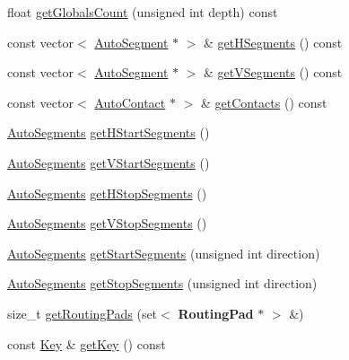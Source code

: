 \begin{DoxyCompactItemize}
\item 
float \hyperlink{classKatabatic_1_1GCell_a315f23abf15d879459eab98a6eeece12}{get\-Globals\-Count} (unsigned int depth) const 
\item 
const vector$<$ \hyperlink{classKatabatic_1_1AutoSegment}{Auto\-Segment} $\ast$ $>$ \& \hyperlink{classKatabatic_1_1GCell_ad885baf0428b0ffa73738e60b9fb6956}{get\-H\-Segments} () const 
\item 
const vector$<$ \hyperlink{classKatabatic_1_1AutoSegment}{Auto\-Segment} $\ast$ $>$ \& \hyperlink{classKatabatic_1_1GCell_a2c54706769cb88ca13d233726ded6f2f}{get\-V\-Segments} () const 
\item 
const vector$<$ \hyperlink{classKatabatic_1_1AutoContact}{Auto\-Contact} $\ast$ $>$ \& \hyperlink{classKatabatic_1_1GCell_ac2d662a9bbf5b80eb92776e4bce06ec5}{get\-Contacts} () const 
\item 
\hyperlink{namespaceKatabatic_a2221b0ddbc24f331809fc86f98e38041}{Auto\-Segments} \hyperlink{classKatabatic_1_1GCell_a79668a41675e9ba0ca59d4b91e3b70be}{get\-H\-Start\-Segments} ()
\item 
\hyperlink{namespaceKatabatic_a2221b0ddbc24f331809fc86f98e38041}{Auto\-Segments} \hyperlink{classKatabatic_1_1GCell_acbd17a4441905a4f5bc33a26bb338d0a}{get\-V\-Start\-Segments} ()
\item 
\hyperlink{namespaceKatabatic_a2221b0ddbc24f331809fc86f98e38041}{Auto\-Segments} \hyperlink{classKatabatic_1_1GCell_a77beccf65527a330f15bed2aba4f9dea}{get\-H\-Stop\-Segments} ()
\item 
\hyperlink{namespaceKatabatic_a2221b0ddbc24f331809fc86f98e38041}{Auto\-Segments} \hyperlink{classKatabatic_1_1GCell_a2f0f038f5700b7b55f22829c5d43aa07}{get\-V\-Stop\-Segments} ()
\item 
\hyperlink{namespaceKatabatic_a2221b0ddbc24f331809fc86f98e38041}{Auto\-Segments} \hyperlink{classKatabatic_1_1GCell_a1f92568d22b1384a8cdf328340fb9160}{get\-Start\-Segments} (unsigned int direction)
\item 
\hyperlink{namespaceKatabatic_a2221b0ddbc24f331809fc86f98e38041}{Auto\-Segments} \hyperlink{classKatabatic_1_1GCell_a80ad0f9e79bccf6aed4fb69b4b795005}{get\-Stop\-Segments} (unsigned int direction)
\item 
size\-\_\-t \hyperlink{classKatabatic_1_1GCell_a63d53a84324e393e7d7b3e73548ed6bf}{get\-Routing\-Pads} (set$<$ {\bf Routing\-Pad} $\ast$ $>$ \&)
\item 
const \hyperlink{classKatabatic_1_1GCell_1_1Key}{Key} \& \hyperlink{classKatabatic_1_1GCell_ab17b3f4c7e2558bc29ea026925fd6fd6}{get\-Key} () const 

\end{DoxyCompactItemize}
